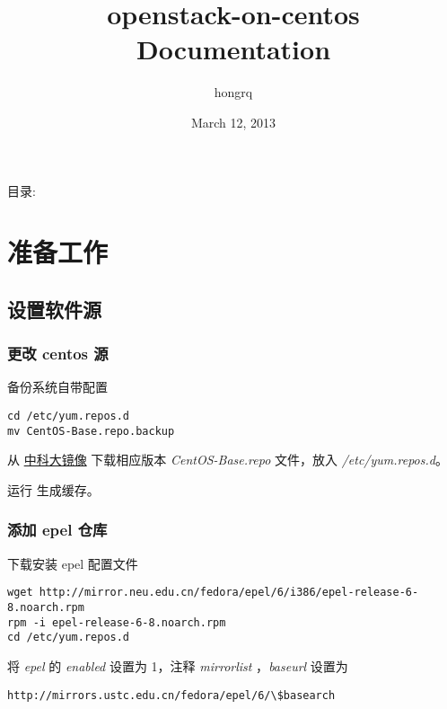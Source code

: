 \documentclass[letterpaper,10pt,english]{sphinxmanual}
\title{openstack-on-centos Documentation}
\date{March 12, 2013}
\author{hongrq}
\begin{document}
\maketitle
\tableofcontents
{}\label{index::doc}


目录:


\chapter{准备工作}
\label{prepare:welcome-to-openstack-on-centos-s-documentation}\label{prepare::doc}\label{prepare:id1}

\section{设置软件源}
\label{prepare:id2}

\subsection{更改 centos 源}
\label{prepare:centos}
备份系统自带配置

\begin{Verbatim}[commandchars=\\\{\}]
cd /etc/yum.repos.d
mv CentOS-Base.repo.backup
\end{Verbatim}

从 \href{http://lug.ustc.edu.cn/wiki/mirrors/help/centos}{中科大镜像} 下载相应版本 \emph{CentOS-Base.repo} 文件，放入 \emph{/etc/yum.repos.d}。

运行  生成缓存。


\subsection{添加 epel 仓库}
\label{prepare:epel}
下载安装 epel 配置文件

\begin{Verbatim}[commandchars=\\\{\}]
wget http://mirror.neu.edu.cn/fedora/epel/6/i386/epel-release-6-8.noarch.rpm
rpm -i epel-release-6-8.noarch.rpm
cd /etc/yum.repos.d
\end{Verbatim}

将 \emph{epel} 的 \emph{enabled} 设置为 1，注释 \emph{mirrorlist} ，\emph{baseurl} 设置为

\begin{Verbatim}[commandchars=\\\{\}]
http://mirrors.ustc.edu.cn/fedora/epel/6/\$basearch
\end{Verbatim}
\end{document}
